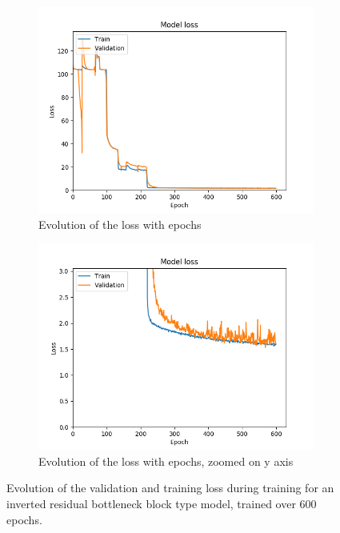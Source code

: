 \begin{figure}
  \begin{center}
    \begin{subfigure}[t]{.49\linewidth}
      \centering
      \includegraphics[width=0.99\linewidth]{figures/nNetloss_mn_816_600.png}
      \caption{Evolution of the loss with epochs}
      \label{fig:mn600loss}
    \end{subfigure}
    \begin{subfigure}[t]{.49\linewidth}
      \centering
      \includegraphics[width=0.99\linewidth]{figures/nNetloss_mn_816_600_zoomed.png}
      \caption{Evolution of the loss with epochs, zoomed on y axis}
      \label{fig:mn600lossZoomed}
    \end{subfigure}
    \caption{Evolution of the validation and training loss during training for an inverted residual bottleneck block type model, trained over $600$ epochs.}
    \label{fig:mn600}
  \end{center}
\end{figure}

